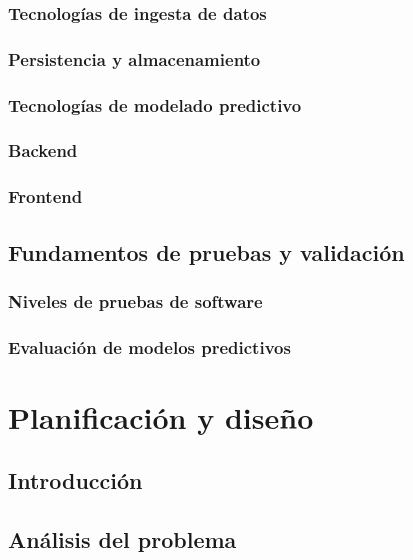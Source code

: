 \documentclass[11pt,oneside,openany]{book}
\begin{document}
\subsection{Tecnologías de ingesta de datos}

\subsection{Persistencia y almacenamiento}

\subsection{Tecnologías de modelado predictivo}

\subsection{Backend}

\subsection{Frontend}

\section{Fundamentos de pruebas y validación}

\subsection{Niveles de pruebas de software}

\subsection{Evaluación de modelos predictivos}

\chapter{Planificación y diseño}

\section{Introducción}

\section{Análisis del problema}
\end{document}
